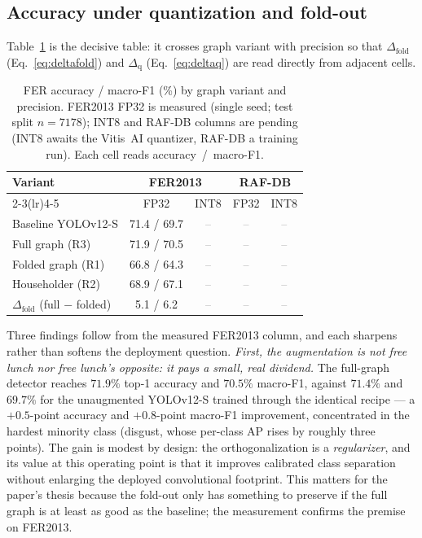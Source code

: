 \documentclass[onecolumn,journal]{IEEEtran}
\newcommand{\tbd}{\textcolor{gray}{--}}
\begin{document}
\subsection{Accuracy under quantization and fold-out}
Table~\ref{tab:accuracy} is the decisive table: it crosses graph variant with precision
so that $\Delta_{\mathrm{fold}}$ (Eq.~\eqref{eq:deltafold}) and $\Delta_{\mathrm{q}}$
(Eq.~\eqref{eq:deltaq}) are read directly from adjacent cells.

\begin{table}[t]
\centering
\caption{FER accuracy / macro-F1 (\%) by graph variant and precision. FER2013 FP32
is measured (single seed; test split $n{=}7178$); INT8 and RAF-DB columns are pending
(INT8 awaits the Vitis~AI quantizer, RAF-DB a training run). Each cell reads
accuracy~/~macro-F1.}
\label{tab:accuracy}
\setlength{\tabcolsep}{5pt}
\renewcommand{\arraystretch}{1.25}
\begin{tabular}{lcccc}
\toprule
\multirow{2}{*}{Variant} & \multicolumn{2}{c}{FER2013} & \multicolumn{2}{c}{RAF-DB}\\
\cmidrule(lr){2-3}\cmidrule(lr){4-5}
 & FP32 & INT8 & FP32 & INT8\\
\midrule
Baseline YOLOv12-S      & 71.4 / 69.7 & \tbd & \tbd & \tbd\\
Full graph (R3)         & 71.9 / 70.5 & \tbd & \tbd & \tbd\\
Folded graph (R1)       & 66.8 / 64.3 & \tbd & \tbd & \tbd\\
Householder (R2)        & 68.9 / 67.1 & \tbd & \tbd & \tbd\\
\midrule
$\Delta_{\mathrm{fold}}$ (full $-$ folded) & 5.1 / 6.2 & \tbd & \tbd & \tbd\\
\bottomrule
\end{tabular}
\end{table}

Three findings follow from the measured FER2013 column, and each sharpens rather than
softens the deployment question. \emph{First, the augmentation is not free lunch nor
free lunch's opposite: it pays a small, real dividend.} The full-graph detector reaches
$71.9\%$ top-1 accuracy and $70.5\%$ macro-F1, against $71.4\%$ and $69.7\%$ for the
unaugmented YOLOv12-S trained through the identical recipe --- a $+0.5$-point accuracy
and $+0.8$-point macro-F1 improvement, concentrated in the hardest minority class
(disgust, whose per-class AP rises by roughly three points). The gain is modest by
design: the orthogonalization is a \emph{regularizer}, and its value at this operating
point is that it improves calibrated class separation without enlarging the deployed
convolutional footprint. This matters for the paper's thesis because the fold-out only
has something to preserve if the full graph is at least as good as the baseline; the
measurement confirms the premise on FER2013.
\end{document}
